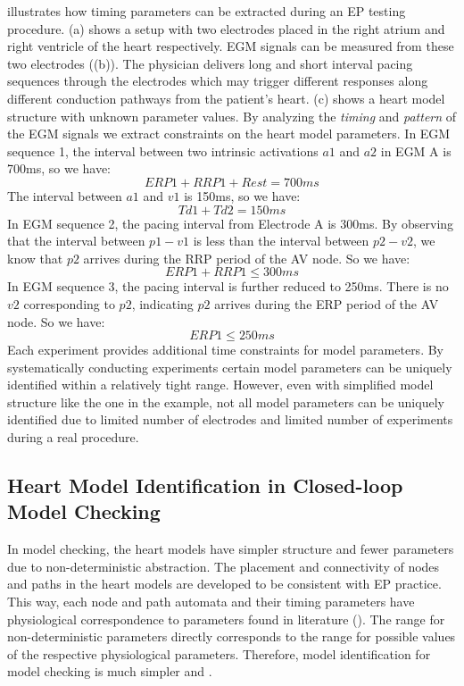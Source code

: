  illustrates how timing parameters can be extracted during an EP testing procedure. (a) shows a setup with two electrodes placed in the right atrium and right ventricle of the heart respectively. EGM signals can be measured from these two electrodes ((b)). The physician delivers long and short interval pacing sequences through the electrodes which may trigger different responses along different conduction pathways from the patient's heart. (c) shows a heart model structure with unknown parameter values. By analyzing the \emph{timing} and \emph{pattern} of the EGM signals we extract constraints on the heart model parameters. In EGM sequence 1, the interval between two intrinsic activations $a1$ and $a2$ in EGM A is 700ms, so we have:
$$ERP1+RRP1+Rest=700ms$$
The interval between $a1$ and $v1$ is 150ms, so we have:
$$Td1+Td2=150ms$$
In EGM sequence 2, the pacing interval from Electrode A is 300ms. By observing that the interval between $p1-v1$ is less than the interval between $p2-v2$, we know that $p2$ arrives during the RRP period of the AV node. So we have:
$$ERP1+RRP1\leq 300ms$$
In EGM sequence 3, the pacing interval is further reduced to 250ms. There is no $v2$ corresponding to $p2$, indicating $p2$ arrives during the ERP period of the AV node. So we have:
$$ERP1\leq 250ms$$
Each experiment provides additional time constraints for model parameters. By systematically conducting experiments certain model parameters can be uniquely identified within a relatively tight range. However, even with simplified model structure like the one in the example, not all model parameters can be uniquely identified due to limited number of electrodes and limited number of experiments during a real procedure.






\subsection{Heart Model Identification in Closed-loop Model Checking}
In model checking, the heart models have simpler structure and fewer parameters due to non-deterministic abstraction. The placement and connectivity of nodes and paths in the heart models are developed to be consistent with EP practice. This way, each node and path automata and their timing parameters have physiological correspondence to parameters found in literature (). The range for non-deterministic parameters directly corresponds to the range for possible values of the respective physiological parameters. Therefore, model identification for model checking is much simpler and . 

